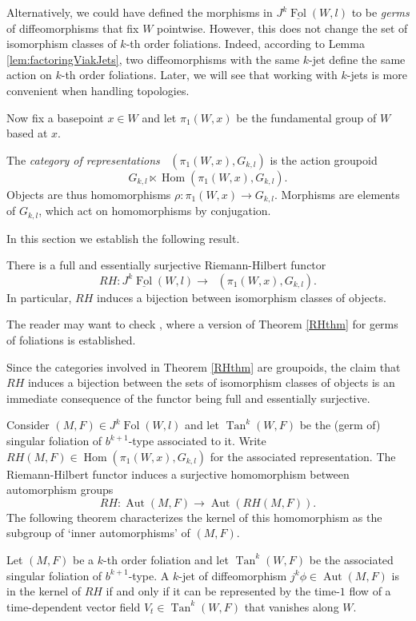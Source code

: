 \documentclass[10pt]{amsart}
\newcommand{\Hom}{\operatorname{Hom}}
\newcommand{\FolCat}{{\underline{\operatorname{Fol}}}}
\newcommand{\FolObj}{{\operatorname{Fol}}}
\DeclareMathOperator{\Rep}{\underline{\operatorname{Rep}}}
\newcommand{\Tan}{{\operatorname{Tan}}}
\DeclareMathOperator{\Aut}{Aut}
\numberwithin{theoremalpha}{section}
\numberwithin{equation}{section}
\numberwithin{definition}{section}
\numberwithin{theorem}{section}
\numberwithin{proposition}{section}
\numberwithin{lemma}{section}
\numberwithin{example}{section}
\numberwithin{remark}{section}
\numberwithin{corollary}{section}
\numberwithin{question}{section}
\numberwithin{problem}{section}
\numberwithin{assumption}{section}
\theoremstyle{named}
\numberwithin{equation}{section}
\begin{document}
\begin{remark} \label{rem:achoice}
Alternatively, we could have defined the morphisms in $J^{k}\FolCat(W,l)$ to be \emph{germs} of diffeomorphisms that fix $W$ pointwise. However, this does not change the set of isomorphism classes of $k$-th order foliations. Indeed, according to Lemma \ref{lem:factoringViakJets}, two diffeomorphisms with the same $k$-jet define the same action on $k$-th order foliations. Later, we will see that working with $k$-jets is more convenient when handling topologies.
\end{remark}

Now fix a basepoint $x \in W$ and let $\pi_{1}(W,x)$ be the fundamental group of $W$ based at $x$. 
\begin{definition}
The \emph{category of representations} $\Rep(\pi_{1}(W, x), G_{k,l})$ is the action groupoid 
\[ G_{k,l} \ltimes \Hom(\pi_{1}(W, x), G_{k,l}). \]
Objects are thus homomorphisms $\rho : \pi_{1}(W,x) \to G_{k,l}$. Morphisms are elements of $G_{k,l}$, which act on homomorphisms by conjugation.
\end{definition}

In this section we establish the following result.
\begin{theorem} \label{RHthm}
There is a full and essentially surjective Riemann-Hilbert functor 
\[ RH: J^{k}\FolCat(W,l) \to \Rep(\pi_{1}(W, x), G_{k,l}). \]
In particular, $RH$ induces a bijection between isomorphism classes of objects. 
\end{theorem}

\begin{remark}
The reader may want to check \cite{CC00}, where a version of Theorem \ref{RHthm} for germs of foliations is established. 
\end{remark}

\begin{remark}
Since the categories involved in Theorem \ref{RHthm} are groupoids, the claim that $RH$ induces a bijection between the sets of isomorphism classes of objects is an immediate consequence of the functor being full and essentially surjective. 
\end{remark}

Consider $(M,F) \in J^{k}\FolObj(W,l)$ and let $\Tan^{k}(W,F)$ be the (germ of) singular foliation of $b^{k+1}$-type associated to it. Write $RH(M,F) \in \Hom(\pi_{1}(W,x), G_{k,l})$ for the associated representation. The Riemann-Hilbert functor induces a surjective homomorphism between automorphism groups 
\[ RH: \Aut(M,F) \to \Aut(RH(M, F)). \]
The following theorem characterizes the kernel of this homomorphism as the subgroup of `inner automorphisms' of $(M,F)$. 
\begin{theorem} \label{innercharacterization}
Let $(M, F)$ be a $k$-th order foliation and let $\Tan^{k}(W, F)$ be the associated singular foliation of $b^{k+1}$-type. A $k$-jet of diffeomorphism $j^k\phi \in \Aut(M,F)$ is in the kernel of $RH$ if and only if it can be represented by the time-$1$ flow of a time-dependent vector field $V_{t} \in \Tan^{k}(W, F)$ that vanishes along $W$.
\end{theorem}
\end{document}

